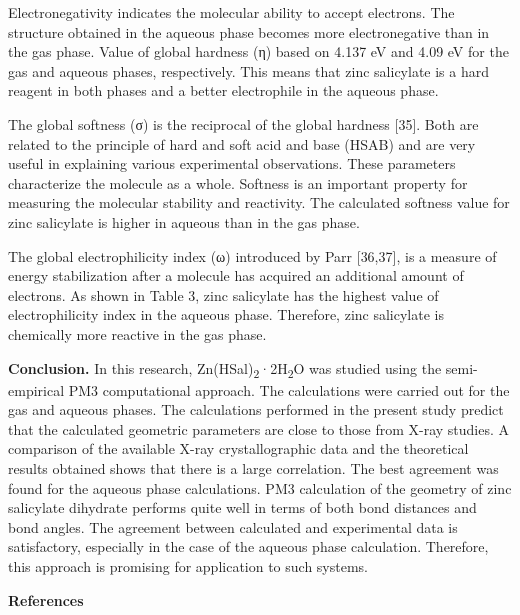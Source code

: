 Electronegativity indicates the molecular ability to accept electrons.
The structure obtained in the aqueous phase becomes more electronegative
than in the gas phase. Value of global hardness (η) based on 4.137 eV
and 4.09 eV for the gas and aqueous phases, respectively. This means
that zinc salicylate is a hard reagent in both phases and a better
electrophile in the aqueous phase.

The global softness (σ) is the reciprocal of the global hardness
{[}35{]}. Both are related to the principle of hard and soft acid and
base (HSAB) and are very useful in explaining various experimental
observations. These parameters characterize the molecule as a whole.
Softness is an important property for measuring the molecular stability
and reactivity. The calculated softness value for zinc salicylate is
higher in aqueous than in the gas phase.

The global electrophilicity index (ω) introduced by Parr {[}36,37{]}, is
a measure of energy stabilization after a molecule has acquired an
additional amount of electrons. As shown in Table 3, zinc salicylate has
the highest value of electrophilicity index in the aqueous phase.
Therefore, zinc salicylate is chemically more reactive in the gas phase.

{\bfseries Conclusion.} In this research,
Zn(HSal)\textsubscript{2}·2H\textsubscript{2}O was studied using the
semi-empirical PM3 computational approach. The calculations were carried
out for the gas and aqueous phases. The calculations performed in the
present study predict that the calculated geometric parameters are close
to those from X-ray studies. A comparison of the available X-ray
crystallographic data and the theoretical results obtained shows that
there is a large correlation. The best agreement was found for the
aqueous phase calculations. PM3 calculation of the geometry of zinc
salicylate dihydrate performs quite well in terms of both bond distances
and bond angles. The agreement between calculated and experimental data
is satisfactory, especially in the case of the aqueous phase
calculation. Therefore, this approach is promising for application to
such systems.

{\bfseries References}

